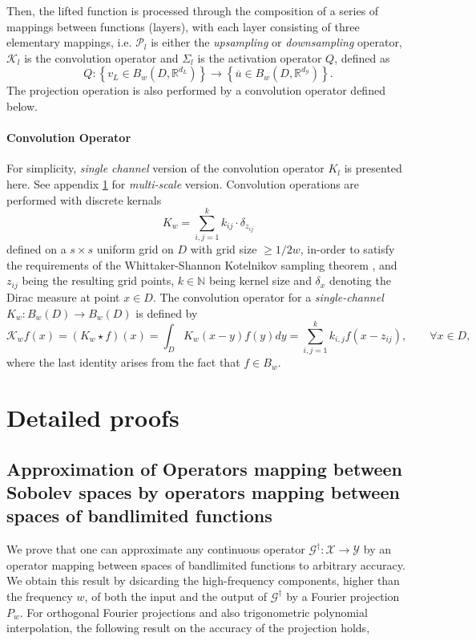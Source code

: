 \documentclass[reqno,10pt]{amsart}
\theoremstyle{plain}
\theoremstyle{definition}
\newcommand{\bb}[1]{\mathbb{#1}}
\newcommand{\cal}[1]{\mathcal{#1}}
\begin{document}
    \noindent Then, the lifted function is processed through the composition of a series of mappings between functions (layers), with each layer consisting of three elementary mappings, i.e. $\cal P_l$ is either the {\it upsampling} or {\it downsampling} operator, $\cal K_l$ is the convolution operator and $\Sigma_l$ is the activation operator $Q$, defined as 
    $$ Q : \left\{v_L \in B_w(D,\bb R^{d_L}) \right\} \to \left\{\overline{u} \in B_w(D,\bb R^{d_{\cal Y}}) \right\}.$$
    The projection operation is also performed by a convolution operator defined below.

    \paragraph{\bf Convolution Operator} For simplicity, {\it single channel} version of the convolution operator $K_l$ is presented here. See appendix \ref{} for {\it multi-scale} version. Convolution operations are performed with discrete kernals
    $$ K_w = \sum_{i,j=1}^{k} k_{ij} \cdot \delta_{z_{ij}}$$
    defined on a $s \times s$ uniform grid on $D$ with grid size $\geq 1/2w$, in-order to satisfy the requirements of the Whittaker-Shannon Kotelnikov sampling theorem \cite{MU2000}, and $z_{ij}$ being the resulting grid points, $k \in\bb N$ being kernel size and $\delta_x$ denoting the Dirac measure at point $x\in D$. The convolution operator for a {\it single-channel} $K_w : B_w(D) \to B_w(D)$ is defined by 
    $$ \cal K_wf(x) = (K_w \star f)(x) = \int_D K_w(x-y)f(y) dy = \sum_{i,j=1}^{k} k_{i,j} f(x-z_{ij}), \qquad \forall x\in D,$$
    where the last identity arises from the fact that $f \in B_w$.















    \appendix
    \section{\bf Detailed proofs}
    \subsection[A.1]{Approximation of Operators mapping between Sobolev spaces by operators mapping between spaces of bandlimited functions} \label{appendix:A.1}
    We prove that one can approximate any continuous operator $\cal G^\dag : \cal X \to \cal Y$ by an operator mapping between spaces of bandlimited functions to arbitrary accuracy. We obtain this result by dsicarding the high-frequency components, higher than the frequency $w$, of both the input and the output of $\cal G^\dag$ by a Fourier projection $P_w$. For orthogonal Fourier projections and also trigonometric polynomial interpolation, the following result on the accuracy of the projection holds,
\end{document}
